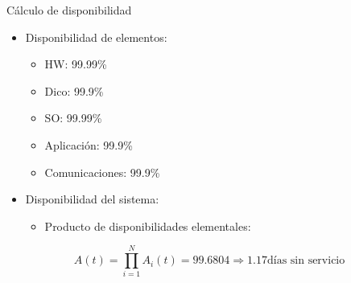 \begin{frame}{Cálculo de disponibilidad}
\begin{itemize}
  \item Disponibilidad de elementos:
    \begin{itemize}
      \item HW: 99.99\%
      \item Dico: 99.9\%
      \item SO: 99.99\%
      \item Aplicación: 99.9\%
      \item Comunicaciones: 99.9\%
    \end{itemize}

  \item Disponibilidad del sistema:
    \begin{itemize}
      \item Producto de disponibilidades elementales:
    \end{itemize}
\end{itemize}
\begin{equation*}
A(t) = \prod_{i=1}^{N} A_i(t) = 99.6804 \Rightarrow 1.17 \text{días sin servicio}
\end{equation*}
\end{frame}
